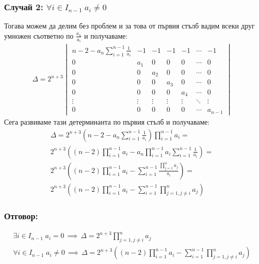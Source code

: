 \documentclass[a4paper, 12pt, oneside]{article}
\begin{document}
\subsubsection*{Случай 2: \(\forall i \in I_{n - 1} \; a_i \neq 0\)}
Тогава можем да делим без проблем и за това от първия стълб вадим всеки друг умножен съответно по \(\displaystyle\frac{a_n}{a_i}\)
и получаваме:
\begin{align*}
\Delta = 2^{n + 3}\begin{vmatrix}
    n - 2 - a_n\displaystyle\sum_{i = 1}^{n - 1}\displaystyle\frac{1}{a_i} & -1 & -1 & -1 & -1 & \cdots & -1 \\
    0 & a_1 & 0 & 0 & 0 & \cdots & 0 \\
    0 & 0 & a_2 & 0 & 0 & \cdots & 0 \\
    0 & 0 & 0 & a_3 & 0 & \cdots & 0 \\
    0 & 0 & 0 & 0 & a_4 & \cdots & 0 \\
    \vdots & \vdots & \vdots & \vdots & \vdots & \ddots & \vdots \\
    0 & 0 & 0 & 0 & 0 & \cdots & a_{n - 1}
\end{vmatrix}
\end{align*}
Сега развиваме тази детерминанта по първия стълб и получаваме:
\begin{align*}
\Delta = 2^{n + 3}\left(n - 2 - a_n\displaystyle\sum_{i = 1}^{n - 1}\displaystyle\frac{1}{a_i}\right)\displaystyle\prod_{i = 1}^{n - 1}a_i = \\
2^{n + 3}\left((n - 2)\displaystyle\prod_{i = 1}^{n - 1}a_i - a_n\displaystyle\prod_{i = 1}^{n - 1}a_i\displaystyle\sum_{i = 1}^{n - 1}\displaystyle\frac{1}{a_i}\right) = \\
2^{n + 3}\left((n - 2)\displaystyle\prod_{i = 1}^{n - 1} a_i - \displaystyle\sum_{i = 1}^{n - 1}\displaystyle\frac{\displaystyle\prod_{j = 1}^n a_j}{a_i}\right) = \\
2^{n + 3}\left((n - 2)\displaystyle\prod_{i = 1}^{n - 1} a_i - \displaystyle\sum_{i = 1}^{n - 1}\displaystyle\prod_{j = 1, j \neq i}^n a_j\right)
\end{align*}
\subsubsection*{Отговор:}
\begin{align*}
    \exists i \in I_{n - 1} \; a_i = 0 \, \implies \, \Delta = 2^{n + 3}\displaystyle\prod_{j = 1, j \neq i}^n a_j \\
    \forall i \in I_{n - 1} \; a_i \neq 0 \, \implies \, \Delta = 2^{n + 3}\left((n - 2)\displaystyle\prod_{i = 1}^{n - 1} a_i - \displaystyle\sum_{i = 1}^{n - 1}\displaystyle\prod_{j = 1, j \neq i}^n a_j\right)
\end{align*}
\end{document}
